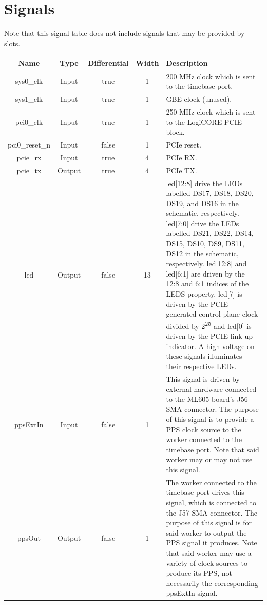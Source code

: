\documentclass{article}
\begin{document}
\section*{Signals}
Note that this signal table does not include signals that may be provided by slots. \\
\begin{tabular}{|c|c|c|c|p{8cm}|}
	\hline
	\rowcolor{blue}
	Name           & Type   & Differential & Width & Description                                          \\
	\hline
	sys0\_clk      & Input  & true         & 1     & 200 MHz clock which is sent to the timebase port.    \\
	\hline
	sys1\_clk      & Input  & true         & 1     & GBE clock (unused).                                  \\
	\hline
	pci0\_clk      & Input  & true         & 1     & 250 MHz clock which is sent to the LogiCORE PCIE block. \\
	\hline
	pci0\_reset\_n & Input  & false        & 1     & PCIe reset.                                          \\
	\hline
	pcie\_rx       & Input  & true         & 4     & PCIe RX.                                             \\
	\hline
	pcie\_tx       & Output & true         & 4     & PCIe TX.                                             \\
	\hline
	led            & Output & false        & 13    & led[12:8] drive the LEDs labelled DS17, DS18, DS20, DS19, and DS16 in the schematic, respectively. led[7:0] drive the LEDs labelled DS21, DS22, DS14, DS15, DS10, DS9, DS11, DS12 in the schematic, respectively. led[12:8] and led[6:1] are driven by the 12:8 and 6:1 indices of the LEDS property. led[7] is driven by the PCIE-generated control plane clock divided by 2\textsuperscript{25} and led[0] is driven by the PCIE link up indicator. A high voltage on these signals illuminates their respective LEDs.\\
	\hline
	ppsExtIn       & Input  & false        & 1     & This signal is driven by external hardware connected to the ML605 board's J56 SMA connector. The purpose of this signal is to provide a PPS clock source to the worker connected to the timebase port. Note that said worker may or may not use this signal. \\
	\hline
	ppsOut         & Output & false        & 1     & The worker connected to the timebase port drives this signal, which is connected to the J57 SMA connector. The purpose of this signal is for said worker to output the PPS signal it produces. Note that said worker may use a variety of clock sources to produce its PPS, not necessarily the corresponding ppsExtIn signal. \\

\end{tabular}
\end{document}
